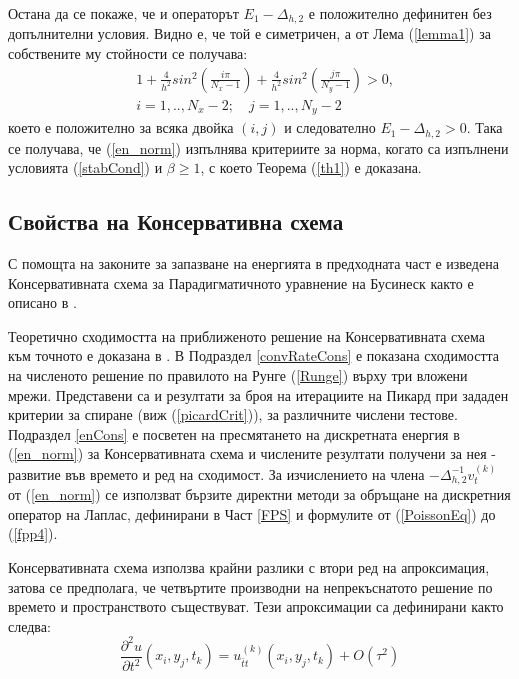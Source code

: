 \documentclass[a4paper]{article}
\newcommand{\be}{\begin{equation}}
\newcommand{\ee}{\end{equation}}
\newcommand{\rf}[1]{(\ref{#1})}
\theoremstyle{remark}
\begin{document}
\begin{large}
Остана да се покаже, че и операторът $E_1 - \Delta_{h, 2}$ е положително дефинитен без допълнителни условия. Видно е, че той е симетричен, а от Лема \rf{lemma1} за собствените му стойности се получава:
\begin{align}
&1+ \frac{4}{h^2}sin^2(\frac{i \pi}{N_x-1}) + \frac{4}{h^2}sin^2(\frac{j \pi}{N_y-1}) >0, \nonumber\\
&i = 1,..,N_x-2; \quad j = 1, .. , N_y-2 \nonumber
\end{align}
което е положително за всяка двойка $(i, j)$ и следователно $E_1 - \Delta_{h, 2} > 0$. Така се получава, че \rf{en_norm} изпълнява критериите за норма, когато са изпълнени условията \rf{stabCond} и $\beta \ge 1$, с което Теорема \rf{th1} е доказана.

\subsection{ Свойства на Консервативна схема}\label{consSchemeHead}
С помощта на законите за запазване на енергията в предходната част е изведена Консервативната схема за Парадигматичното уравнение на Бусинеск както е описано в \cite{ref25, ref999, ref1000}.

Теоретично сходимостта на приближеното решение на Консервативната схема към точното е доказана в \cite{ref999, ref1000}. В Подраздел \ref{convRateCons} е показана сходимостта на численото решение по правилото на Рунге \rf{Runge} върху три вложени мрежи. Представени са и резултати за броя на итерациите на Пикард при зададен критерии за спиране (виж \rf{picardCrit}), за различните числени тестове. Подраздел \ref{enCons} е посветен на пресмятането на дискретната енергия в \rf{en_norm} за Консервативната схема и числените резултати получени за нея - развитие във времето и ред на сходимост. За изчислението на члена $-\Delta_{h,2}^{-1}v_{t}^{(k)}$ от \rf{en_norm} се използват бързите директни методи за обръщане на дискретния оператор на Лаплас, дефинирани в Част \ref{FPS} и формулите от \rf{PoissonEq} до \rf{fpp4}.

Консервативната схема използва крайни разлики с втори ред на апроксимация, затова се предполага, че четвъртите производни на непрекъснатото решение по времето и пространството съществуват. Тези апроксимации са дефинирани както следва:
\be\label{difft}
\frac{\partial^2 u}{\partial t^2}(x_i, y_j, t_k ) = u^{(k)}_{\bar{t}t}(x_i, y_j, t_k ) + O(\tau^2) 
\ee


\end{large}
\end{document}

